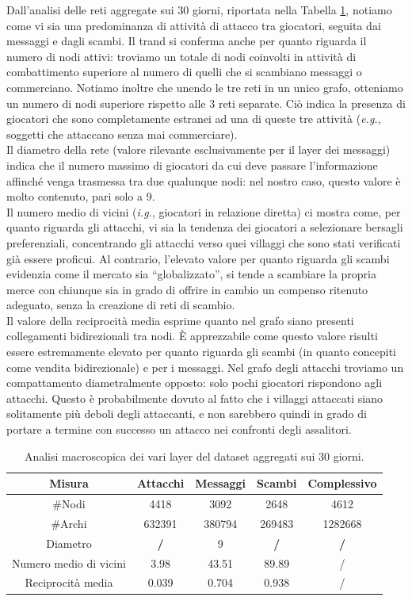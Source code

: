 Dall'analisi delle reti aggregate sui 30 giorni, riportata nella Tabella \ref{tab:summary}, notiamo come vi sia una predominanza di attività di attacco tra giocatori, seguita dai messaggi e dagli scambi. Il trand si conferma anche per quanto riguarda il numero di nodi attivi: troviamo un totale di nodi coinvolti in attività di combattimento superiore al numero di quelli che si scambiano messaggi o commerciano. Notiamo inoltre che unendo le tre reti in un unico grafo, otteniamo un numero di nodi superiore rispetto alle 3 reti separate. Ciò indica la presenza di giocatori che sono completamente estranei ad una di queste tre attività (\textit{e.g.}, soggetti che attaccano senza mai commerciare).\\
Il diametro della rete (valore rilevante esclusivamente per il layer dei messaggi) indica che il numero massimo di giocatori da cui deve passare l'informazione affinché venga trasmessa tra due qualunque nodi: nel nostro caso, questo valore è molto contenuto, pari solo a 9.\\
Il numero medio di vicini (\textit{i.g.}, giocatori in relazione diretta) ci mostra come, per quanto riguarda gli attacchi, vi sia la tendenza dei giocatori a selezionare bersagli preferenziali, concentrando gli attacchi verso quei villaggi che sono stati verificati già essere proficui. Al contrario, l'elevato valore per quanto riguarda gli scambi evidenzia come il mercato sia “globalizzato”, si tende a scambiare la propria merce con chiunque sia in grado di offrire in cambio un compenso ritenuto adeguato, senza la creazione di reti di scambio.\\
Il valore della reciprocità media esprime quanto nel grafo siano presenti collegamenti bidirezionali tra nodi. È apprezzabile come questo valore risulti essere estremamente elevato per quanto riguarda gli scambi (in quanto concepiti come vendita bidirezionale) e per i messaggi. Nel grafo degli attacchi troviamo un compattamento diametralmente opposto: solo pochi giocatori rispondono agli attacchi. Questo è probabilmente dovuto al fatto che i villaggi attaccati siano solitamente più deboli degli attaccanti, e non sarebbero quindi in grado di portare a termine con successo un attacco nei confronti degli assalitori.
\begin{table}[h]
	\centering
	\caption{Analisi macroscopica dei vari layer del dataset aggregati sui 30 giorni.}
	\begin{tabular}{|c|c|c|c|c|}
		\hline 
		Misura & Attacchi & Messaggi & Scambi & Complessivo \\ 
		\hline 
		$\#$Nodi & 4418 & 3092 & 2648 & 4612 \\ 
		\hline 
		$\#$Archi & 632391 & 380794 & 269483 & 1282668 \\ 
		\hline 
		Diametro & \textbf{/} & 9 & \textbf{/} & \textbf{/} \\ 
		\hline 
		Numero medio di vicini & 3.98 & 43.51 & 89.89 & / \\ 
		\hline 
		Reciprocità media & 0.039 & 0.704 & 0.938 & / \\ 
		\hline 
	\end{tabular} 
	\label{tab:summary}
\end{table}


